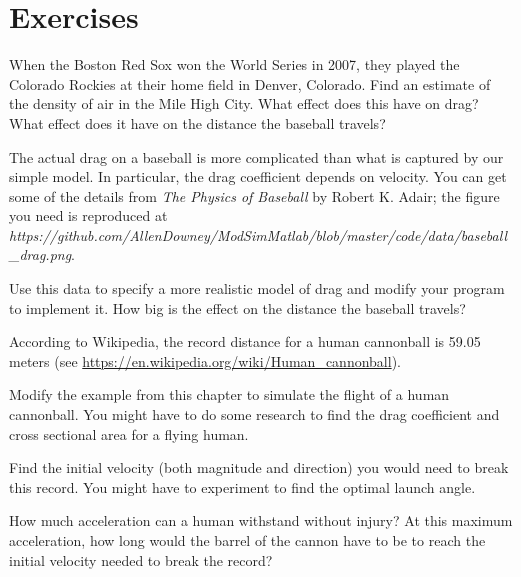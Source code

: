 \section{Exercises}

\begin{ex}


When the Boston Red Sox won the World Series in 2007, they played the
Colorado Rockies at their home field in Denver, Colorado.  Find an
estimate of the density of air in the Mile High City.  What effect
does this have on drag?  What effect does it have on the distance the baseball travels?
\end{ex}

\begin{ex}


The actual drag on a baseball is more complicated than what is
captured by our simple model.  In particular, the drag coefficient
depends on velocity.  You can get some of the details from {\em The
Physics of Baseball} by Robert K. Adair; the figure you need is reproduced at \emph{https://github.com/AllenDowney/ModSimMatlab/blob/master/code/data/baseball\_drag.png}.

Use this data to specify a more realistic model of drag and modify your
program to implement it.  How big is the effect on the distance the baseball travels?
\end{ex}


\begin{ex}
\label{cannon}


According to Wikipedia, the record distance for a human cannonball is 59.05 meters (see \url{https://en.wikipedia.org/wiki/Human_cannonball}).

Modify the example from this chapter to simulate the flight of a human cannonball.  You might have to do some research to find the drag coefficient and cross sectional area for a flying human.

Find the initial velocity (both magnitude and direction) you would need to break this record.  You might have to experiment to find the optimal launch angle.

How much acceleration can a human withstand without injury?  At this maximum acceleration, how long would the barrel of the cannon have to be to reach the initial velocity needed to break the record?
\end{ex}


